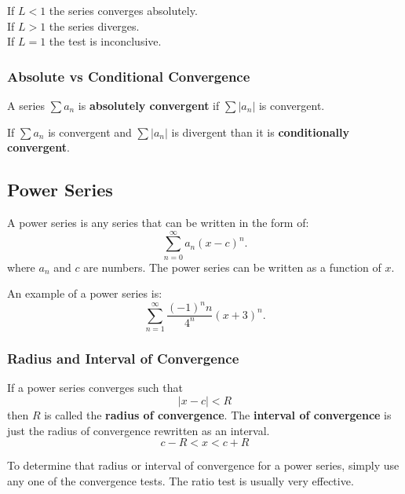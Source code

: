 \documentclass[12pt]{article}
\begin{document}
\noindent If $L < 1$ the series converges absolutely.
\\ If $L > 1$ the series diverges.
\\ If $L = 1$ the test is inconclusive.

\subsubsection{Absolute vs Conditional Convergence}
\noindent A series $\displaystyle \sum a_n$ is \textbf{absolutely convergent} if $\displaystyle \sum |a_n|$ is convergent.

\noindent If $\displaystyle \sum a_n$ is convergent and $\displaystyle \sum |a_n|$ is divergent than it is \textbf{conditionally convergent}.

\subsection{Power Series}
A power series is any series that can be written in the form of:
\[ \sum_{n=0}^\infty a_n (x-c)^n. \]
where $a_n$ and $c$ are numbers. The power series can be written as a function of $x$.

\noindent An example of a power series is:
\[ \sum_{n=1}^\infty \frac{(-1)^n n}{4^n} (x+3)^n. \]

\subsubsection{Radius and Interval of Convergence}
\noindent If a power series converges such that
\[ |x-c| < R \]
then $R$ is called the \textbf{radius of convergence}. The \textbf{interval of convergence} is just the radius of convergence rewritten as an interval.
\[ c - R < x < c + R \]

To determine that radius or interval of convergence for a power series, simply use any one of the convergence tests. The ratio test is usually very effective.
\end{document}
